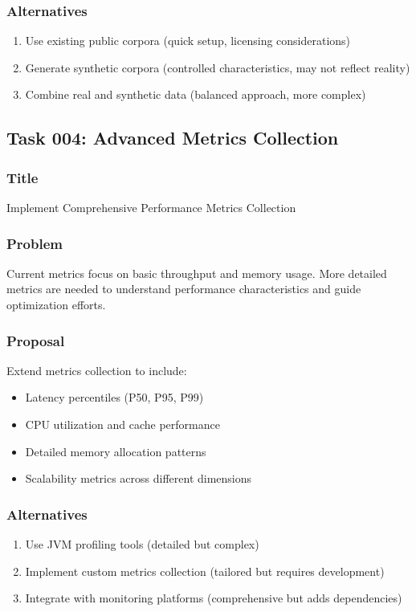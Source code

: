 \documentclass[11pt,a4paper]{article}
\begin{document}
\subsubsection{Alternatives}
\begin{enumerate}
    \item Use existing public corpora (quick setup, licensing considerations)
    \item Generate synthetic corpora (controlled characteristics, may not reflect reality)
    \item Combine real and synthetic data (balanced approach, more complex)
\end{enumerate}

\subsection{Task 004: Advanced Metrics Collection}

\subsubsection{Title}
Implement Comprehensive Performance Metrics Collection

\subsubsection{Problem}
Current metrics focus on basic throughput and memory usage. More detailed metrics are needed to understand performance characteristics and guide optimization efforts.

\subsubsection{Proposal}
Extend metrics collection to include:
\begin{itemize}
    \item Latency percentiles (P50, P95, P99)
    \item CPU utilization and cache performance
    \item Detailed memory allocation patterns
    \item Scalability metrics across different dimensions
\end{itemize}

\subsubsection{Alternatives}
\begin{enumerate}
    \item Use JVM profiling tools (detailed but complex)
    \item Implement custom metrics collection (tailored but requires development)
    \item Integrate with monitoring platforms (comprehensive but adds dependencies)
\end{enumerate}
\end{document}
